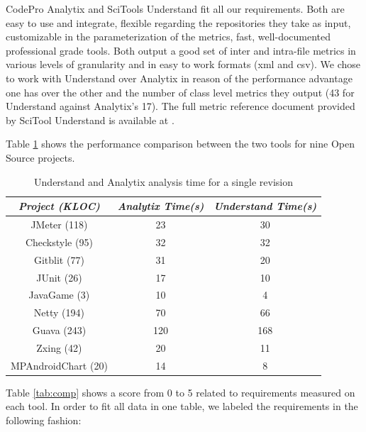 CodePro Analytix and SciTools Understand fit all our requirements. Both are easy to use and integrate, flexible regarding the repositories they take as input, customizable in the parameterization of the metrics, fast, well-documented professional grade tools. Both output a good set of inter and intra-file metrics in various levels of granularity and in easy to work formats (xml and csv). We chose to work with Understand over Analytix in reason of the performance advantage one has over the other and the number of class level metrics they output (43 for Understand against Analytix’s 17). The full metric reference document provided by SciTool Understand is available at \cite{ref:und}.

Table \ref{tab:und_ana_times} shows the performance comparison between the two tools for nine Open Source projects.
\begin{table}[ht]
	\caption{Understand and Analytix analysis time for a single revision}
	\centering
	\label{tab:und_ana_times}
	\begin{tabular}{c|c|c}
		\hline
		\textit{Project (KLOC)} & \textit{Analytix Time(s)} & \textit{Understand Time(s)} \\
		\hline
		\hline
		JMeter (118)            & 23                        & 30                          \\
		Checkstyle (95)         & 32                        & 32                          \\
		Gitblit (77)            & 31                        & 20                          \\
		JUnit (26)              & 17                        & 10                          \\
		JavaGame (3)            & 10                        & 4                           \\
		Netty (194)             & 70                        & 66                          \\
		Guava (243)             & 120                       & 168                         \\
		Zxing (42)              & 20                        & 11                          \\
		MPAndroidChart (20)     & 14                        & 8                           \\
		\hline
	\end{tabular}
\end{table}


Table \ref{tab:comp} shows a score from 0 to 5 related to requirements measured on each tool. In order to fit all data in one table, we labeled the requirements in the following fashion:

